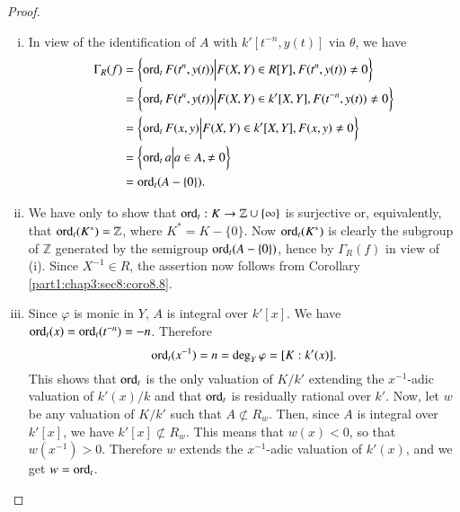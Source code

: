 \begin{proof}
  ~
\begin{enumerate}[(i)]
\item In view of the identification of $A$ with $k' [t^{-n}, y(t)]$
  via $\theta$, we have
  \begin{align*}
    \Gamma_R (f) & = \left\{ \operatorname{ord}_t F(t^n, y(t)) \Big| F(X, Y) \in
    R[Y], F(t^n, y(t)) \neq 0 \right\}\\
     & = \left\{ \operatorname{ord}_t F(t^n, y(t)) \Big| F(X, Y) \in
    k' [X, Y], F(t^{-n}, y(t)) \neq 0 \right\}\\
     & = \left\{ \operatorname{ord}_t F(x, y) \Big| F(X, Y) \in
    k' [X, Y], F(x, y) \neq 0 \right\}\\
     & = \left\{ \operatorname{ord}_t a \Big| a \in A, \neq 0 \right\}\\
    & = \operatorname{ord}_t (A- \{ 0\}).
  \end{align*}
  \item We have only to show that $\operatorname{ord}_t: K \to \mathbb{Z} \cup \{
    \infty \}$ is surjective or, equivalently, that $\operatorname{ord}_t (K^*)=
    \mathbb{Z}$, where $K^* = K - \{ 0 \}$. Now $\operatorname{ord}_t (K^*)$ is
    clearly the subgroup of $\mathbb{Z}$ generated by the semigroup
    $\operatorname{ord}_t(A-\{ 0\})$, hence by $\Gamma_R (f)$ in view of (i). Since
    $X^{-1}\in R$, the assertion now follows from
    Corollary \ref{part1:chap3:sec8:coro8.8}.
    \item Since $\varphi$ is monic in $Y$, $A$ is integral over
      $k'[x]$. We have $\operatorname{ord}_t (x) = \operatorname{ord}_t (t^{-n})= -n$. Therefore
      $$
      \operatorname{ord}_t (x^{-1}) =n = \deg_Y \varphi = [K : k' (x)].
      $$
      This shows that $\operatorname{ord}_t$ is the only valuation of $K/k'$
      extending the $x^{-1}$-adic valuation of $k'(x)/k$ and that
      $\operatorname{ord}_t$ is residually rational over $k'$. Now, let $w$ be any
      valuation of $K/k'$ such that $A \nsubset R_w$. Then, since $A$
      is integral over $k'[x]$, we have $k' [x]\nsubset R_w$. This
      means that $w(x)< 0$, so that $w(x^{-1})>0$. Therefore $w$
      extends the $x^{-1}$-adic valuation of $k'(x)$, and we get $w =
      \operatorname{ord}_t$.


\end{enumerate}
\end{proof}
